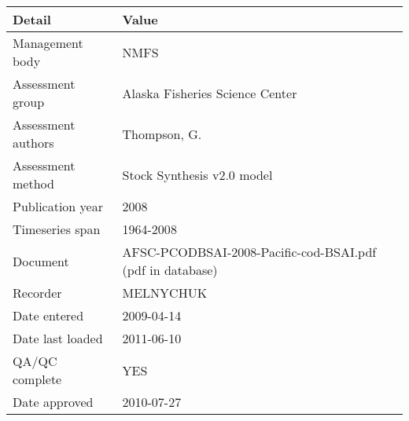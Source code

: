 \begin{table}[htb]
\centering
\begin{tabular}{lp{7cm}}
\toprule
Detail & Value \\
\midrule
Management body    & NMFS                                                      \\
Assessment group   & Alaska Fisheries Science Center                           \\
Assessment authors & Thompson, G.                                              \\
Assessment method  & Stock Synthesis v2.0 model                                \\
Publication year   & 2008                                                      \\
Timeseries span    & 1964-2008                                                 \\
Document           & AFSC-PCODBSAI-2008-Pacific-cod-BSAI.pdf (pdf in database) \\
Recorder           & MELNYCHUK                                                 \\
Date entered       & 2009-04-14                                                \\
Date last loaded   & 2011-06-10                                                \\
QA/QC complete     & YES                                                       \\
Date approved      & 2010-07-27                                                \\
\bottomrule
\end{tabular}
\label{tab:assessdet}
\end{table}
